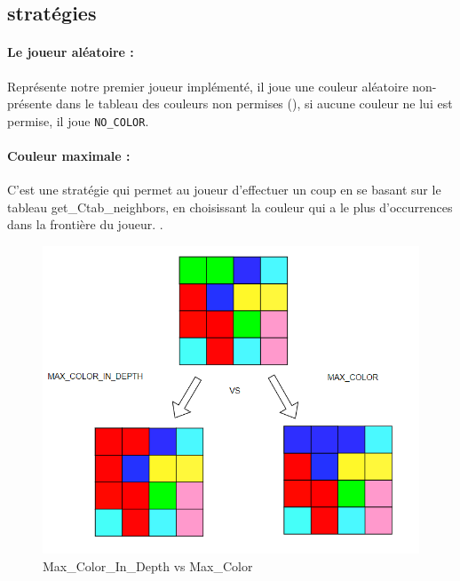 \documentclass[11pt]{article}
\begin{document}
\noindent



\subsection{stratégies}



\paragraph{Le joueur aléatoire :\\}




Représente notre premier joueur implémenté, il joue une couleur aléatoire non-présente dans le tableau des couleurs non permises (), si aucune couleur ne lui est permise, il joue \texttt{NO\_COLOR}.\\



\paragraph{Couleur maximale : \\}



C'est une stratégie qui permet au joueur d'effectuer un coup en se basant sur le tableau get\_Ctab\_neighbors, en choisissant la couleur qui a le plus d'occurrences dans la frontière du joueur.
.\\
\begin{figure}[!h]
\begin{center}
\includegraphics[scale=0.7]{./img/graph_depth2.png}
\caption{Max\_Color\_In\_Depth vs Max\_Color }
\label{fig: 6}
\end{center}
\end{figure}
\end{document}
